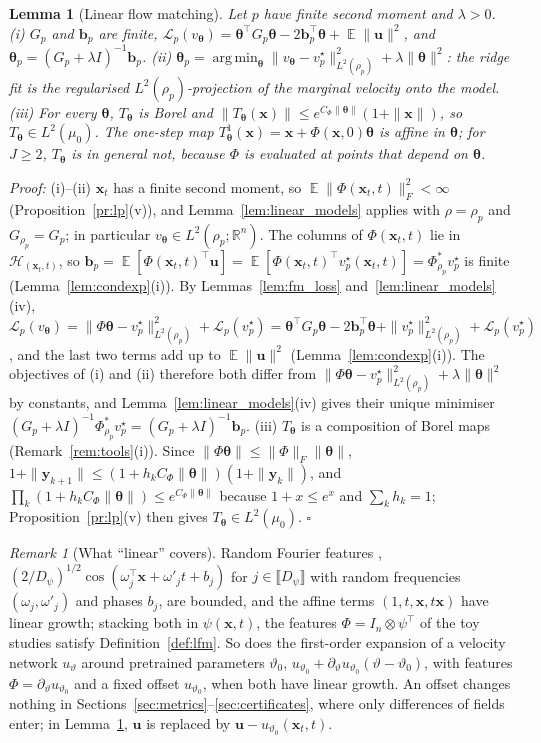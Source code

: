 \documentclass{article}
\DeclareMathOperator*{\argmin}{arg\,min}
\DeclareMathOperator{\E}{\mathbb{E}}
\newcommand{\RR}{\mathbb{R}}
\newcommand{\cL}{\mathcal{L}}
\newcommand{\bth}{\boldsymbol{\theta}}
\newcommand{\bx}{\mathbf{x}}
\newcommand{\by}{\mathbf{y}}
\newcommand{\bu}{\mathbf{u}}
\newcommand{\bb}{\mathbf{b}}
\newcommand{\vstar}{v^{\star}}
\theoremstyle{plain}
\newtheorem{lemma}[theorem]{Lemma}
\theoremstyle{remark}
\newtheorem{remark}[theorem]{Remark}
\begin{document}
\begin{lemma}[Linear flow matching]\label{lem:lfm}
Let $p$ have finite second moment and $\lambda>0$.
(i) $G_p$ and $\bb_p$ are finite, $\cL_p(v_{\bth})=\bth^\top G_p\bth-2\bb_p^\top\bth+\E\|\bu\|^2$, and
$\bth_p=(G_p+\lambda I)^{-1}\bb_p$.
(ii) $\bth_p=\argmin_{\bth}\|v_{\bth}-\vstar_p\|^2_{L^2(\rho_p)}+\lambda\|\bth\|^2$: the ridge fit is the
regularised $L^2(\rho_p)$-projection of the marginal velocity onto the model.
(iii) For every $\bth$, $T_{\bth}$ is Borel and $\|T_{\bth}(\bx)\|\le e^{C_\Phi\|\bth\|}(1+\|\bx\|)$, so
$T_{\bth}\in L^2(\mu_0)$. The one-step map $T^1_{\bth}(\bx)=\bx+\Phi(\bx,0)\bth$ is affine in $\bth$; for
$J\ge2$, $T_{\bth}$ is in general not, because $\Phi$ is evaluated at points that depend on $\bth$.
\end{lemma}
\textit{Proof:}
(i)--(ii) $\bx_t$ has a finite second moment, so $\E\|\Phi(\bx_t,t)\|_F^2<\infty$ (Proposition~\ref{pr:lp}(v)), and
Lemma~\ref{lem:linear_models} applies with $\rho=\rho_p$ and $G_{\rho_p}=G_p$; in particular $v_{\bth}\in L^2(\rho_p;\RR^n)$. The columns of
$\Phi(\bx_t,t)$ lie in $\mathcal H_{(\bx_t,t)}$, so $\bb_p=\E[\Phi(\bx_t,t)^\top\bu]=\E[\Phi(\bx_t,t)^\top\vstar_p(\bx_t,t)]=\Phi_{\rho_p}^*\vstar_p$ is finite
(Lemma~\ref{lem:condexp}(i)). By Lemmas~\ref{lem:fm_loss} and~\ref{lem:linear_models}(iv),
$\cL_p(v_{\bth})=\|\Phi\bth-\vstar_p\|^2_{L^2(\rho_p)}+\cL_p(\vstar_p)=\bth^\top G_p\bth-2\bb_p^\top\bth+\|\vstar_p\|^2_{L^2(\rho_p)}+\cL_p(\vstar_p)$, and the last
two terms add up to $\E\|\bu\|^2$ (Lemma~\ref{lem:condexp}(i)). The objectives of (i) and (ii) therefore both differ from
$\|\Phi\bth-\vstar_p\|^2_{L^2(\rho_p)}+\lambda\|\bth\|^2$ by constants, and Lemma~\ref{lem:linear_models}(iv) gives their unique minimiser
$(G_p+\lambda I)^{-1}\Phi^*_{\rho_p}\vstar_p=(G_p+\lambda I)^{-1}\bb_p$.
(iii) $T_{\bth}$ is a composition of Borel maps (Remark~\ref{rem:tools}(i)). Since $\|\Phi\bth\|\le\|\Phi\|_F\|\bth\|$,
$1+\|\by_{k+1}\|\le(1+h_kC_\Phi\|\bth\|)(1+\|\by_k\|)$, and $\prod_k(1+h_kC_\Phi\|\bth\|)\le e^{C_\Phi\|\bth\|}$ because $1+x\le e^x$ and
$\sum_kh_k=1$; Proposition~\ref{pr:lp}(v) then gives $T_{\bth}\in L^2(\mu_0)$. \hfill$\square$

\begin{remark}[What ``linear'' covers]\label{rem:linearised}
Random Fourier features \citep{rahimi2007random}, $(2/D_\psi)^{1/2}\cos(\omega_j^\top\bx+\omega'_jt+b_j)$ for $j\in\llbracket D_\psi\rrbracket$ with
random frequencies $(\omega_j,\omega'_j)$ and phases $b_j$, are bounded, and the affine terms $(1,t,\bx,t\bx)$ have linear growth; stacking
both in $\psi(\bx,t)$, the features $\Phi=I_n\otimes\psi^\top$ of the toy studies satisfy Definition~\ref{def:lfm}. So does the first-order expansion of a velocity network $u_\vartheta$
around pretrained parameters $\vartheta_0$, $u_{\vartheta_0}+\partial_\vartheta u_{\vartheta_0}(\vartheta-\vartheta_0)$, with
features $\Phi=\partial_\vartheta u_{\vartheta_0}$ and a fixed offset $u_{\vartheta_0}$, when both have linear
growth. An offset changes nothing in Sections~\ref{sec:metrics}--\ref{sec:certificates}, where only
differences of fields enter; in Lemma~\ref{lem:lfm}, $\bu$ is replaced by $\bu-u_{\vartheta_0}(\bx_t,t)$.
\end{remark}
\end{document}
